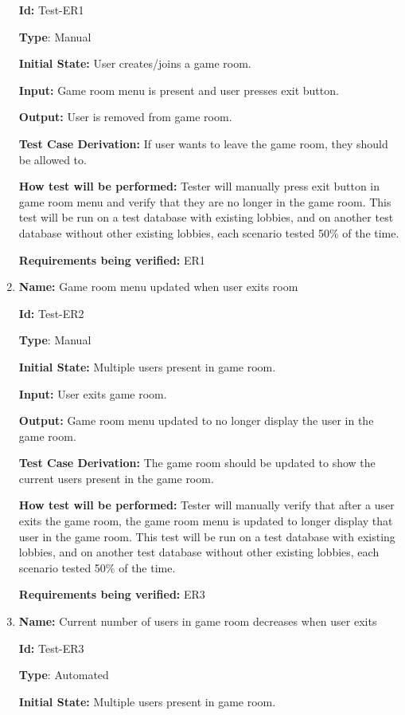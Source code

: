 \documentclass[12pt, titlepage]{article}
\begin{document}
\begin{enumerate}
\textbf{Id:} Test-ER1

\textbf{Type}: Manual

\textbf{Initial State:} User creates/joins a game room.

\textbf{Input:} Game room menu is present and user presses exit button.

\textbf{Output:} User is removed from game room.

\textbf{Test Case Derivation:} If user wants to leave the game room, they should be allowed to.

\textbf{How test will be performed:} Tester will manually press exit button in game room menu and verify that they are no longer in the game room. This test will be run on a test database with existing lobbies, and on another test database without other existing lobbies, each scenario tested 50\% of the time.

\textbf{Requirements being verified: } ER1

\item{\textbf{Name:} Game room menu updated when user exits room} \label{itm:Test-ER2}

\textbf{Id:} Test-ER2

\textbf{Type}: Manual

\textbf{Initial State:} Multiple users present in game room.

\textbf{Input:} User exits game room.

\textbf{Output:} Game room menu updated to no longer display the user in the game room.

\textbf{Test Case Derivation:} The game room should be updated to show the current users present in the game room.

\textbf{How test will be performed:} Tester will manually verify that after a user exits the game room, the game room menu is updated to longer display that user in the game room. This test will be run on a test database with existing lobbies, and on another test database without other existing lobbies, each scenario tested 50\% of the time.

\textbf{Requirements being verified: } ER3

\item{\textbf{Name:} Current number of users in game room decreases when user exits} \label{itm:Test-ER3}

\textbf{Id:} Test-ER3

\textbf{Type}: Automated

\textbf{Initial State:} Multiple users present in game room.


\end{enumerate}
\end{document}
